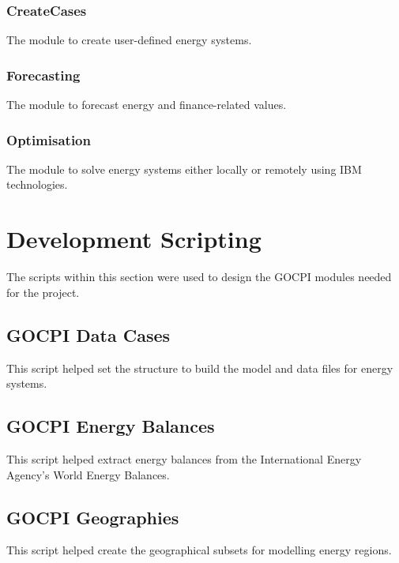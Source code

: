 \documentclass[12pt]{article}
\begin{document}
\subsubsection{CreateCases}
The module to create user-defined energy systems.

\subsubsection{Forecasting}
The module to forecast energy and finance-related values.

\subsubsection{Optimisation}
The module to solve energy systems either locally or remotely using IBM technologies.

\newpage

\section{Development Scripting}
The scripts within this section were used to design the GOCPI modules needed for the project.
\subsection{GOCPI Data Cases}
This script helped set the structure to build the model and data files for energy systems.

\subsection{GOCPI Energy Balances}
This script helped extract energy balances from the International Energy Agency's World Energy Balances.

\subsection{GOCPI Geographies}
This script helped create the geographical subsets for modelling energy regions.

\end{document}
